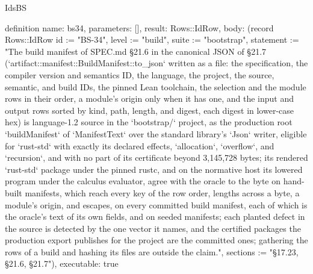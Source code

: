 \begin{lexlean}{IdsBS}
\begin{semanticmodule}
definition{
  name: bs34,
  parameters: [],
  result: Rows::IdRow,
  body: (record Rows::IdRow {id := "BS-34", level := "build", suite := "bootstrap", statement := "The build manifest of SPEC.md §21.6 in the canonical JSON of §21.7 (`artifact::manifest::BuildManifest::to_json` written as a file: the specification, the compiler version and semantics ID, the language, the project, the source, semantic, and build IDs, the pinned Lean toolchain, the selection and the module rows in their order, a module's origin only when it has one, and the input and output rows sorted by kind, path, length, and digest, each digest in lower-case hex) is language-1.2 source in the `bootstrap/` project, as the production root `buildManifest` of `ManifestText` over the standard library's `Json` writer, eligible for `rust-std` with exactly its declared effects, `allocation`, `overflow`, and `recursion`, and with no part of its certificate beyond 3,145,728 bytes; its rendered `rust-std` package under the pinned rustc, and on the normative host its lowered program under the calculus evaluator, agree with the oracle to the byte on hand-built manifests, which reach every key of the row order, lengths across a byte, a module's origin, and escapes, on every committed build manifest, each of which is the oracle's text of its own fields, and on seeded manifests; each planted defect in the source is detected by the one vector it names, and the certified packages the production export publishes for the project are the committed ones; gathering the rows of a build and hashing its files are outside the claim.", sections := "§17.23, §21.6, §21.7"}),
  executable: true
}


\end{semanticmodule}
\end{lexlean}
